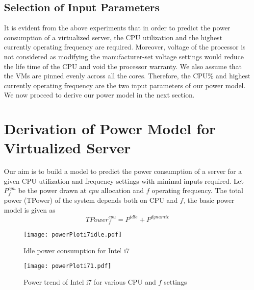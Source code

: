 \documentclass{sig-alternate}
\begin{document}
\subsection{Selection of Input Parameters}
It is evident from the above experiments that in order to predict the power consumption of a virtualized server, the CPU utilization and the highest currently operating frequency are required. Moreover, voltage of the processor is not considered as modifying the manufacturer-set voltage settings would reduce the life time of the CPU and void the processor warranty. We also assume that the VMs are pinned evenly across all the cores. Therefore, the CPU\% and highest currently operating frequency are the two input parameters of our power model. We now proceed to derive our power model in the next section. 
\section{Derivation of Power Model for Virtualized Server}
\label{sec:WModelDer}
Our aim is to build a model to predict the power consumption of a server for a given CPU utilization and frequency settings with minimal inputs required. Let $P^{cpu}_f$ be the power drawn at $cpu$ allocation and $f$ operating frequency. The total power (TPower) of the system depends both on CPU and $f$, the basic power model is given as 
\begin{equation}
 TPower^{cpu}_{f} = P^{idle} + P^{dynamic}
 \label{eq:begin}
\end{equation}
\begin{figure}[!htbp]
\begin{center}
 \texttt{[image: powerPloti7idle.pdf]}
\caption{Idle power consumption for Intel i7}
\label{fig:powerPloti7idle}
\end{center}
\vspace{-0.5cm}
\end{figure}
\begin{figure}[!htbp]
\begin{center}
\vspace{-0.5cm	}
 \texttt{[image: powerPloti71.pdf]}
\caption{Power trend of Intel i7 for various CPU and $f$ settings}
\label{fig:powerPloti7}
\end{center}
\vspace{-0.5cm}
\end{figure}
\end{document}
